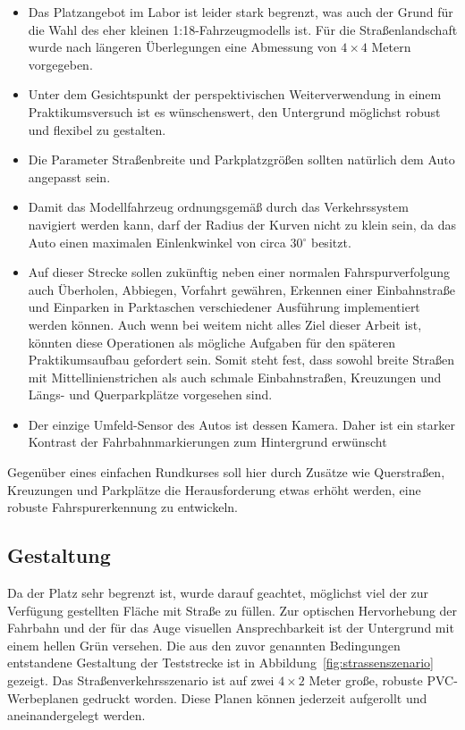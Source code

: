 \begin{itemize}
	\item Das Platzangebot im Labor ist leider stark begrenzt, was auch der Grund für die Wahl des eher kleinen 1:18-Fahrzeugmodells ist. Für die Straßenlandschaft wurde nach längeren Überlegungen eine Abmessung von \(4 \times 4\) Metern vorgegeben.
	
	\item Unter dem Gesichtspunkt der perspektivischen Weiterverwendung in einem Praktikumsversuch ist es wünschenswert, den Untergrund möglichst robust und flexibel zu gestalten.
	
	\item Die Parameter Straßenbreite und Parkplatzgrößen sollten natürlich dem Auto angepasst sein. 
	
	\item Damit das Modellfahrzeug ordnungsgemäß durch das Verkehrssystem navigiert werden kann, darf der Radius der Kurven nicht zu klein sein, da das Auto einen maximalen Einlenkwinkel von circa 30\(^\circ\) besitzt. 
	
	\item Auf dieser Strecke sollen zukünftig neben einer normalen Fahrspurverfolgung auch Überholen, Abbiegen, Vorfahrt gewähren, Erkennen einer Einbahnstraße und Einparken in Parktaschen verschiedener Ausführung implementiert werden können. Auch wenn bei weitem nicht alles Ziel dieser Arbeit ist, könnten diese Operationen als mögliche Aufgaben für den späteren Praktikumsaufbau gefordert sein. Somit steht fest, dass sowohl breite Straßen mit Mittellinienstrichen als auch schmale Einbahnstraßen, Kreuzungen und Längs- und Querparkplätze vorgesehen sind.
	
	\item Der einzige Umfeld-Sensor des Autos ist dessen Kamera. Daher ist ein starker Kontrast der Fahrbahnmarkierungen zum Hintergrund erwünscht
\end{itemize}

Gegenüber eines einfachen Rundkurses soll hier durch Zusätze wie Querstraßen, Kreuzungen und Parkplätze die Herausforderung etwas erhöht werden, eine robuste Fahrspurerkennung zu entwickeln. 

\subsection{Gestaltung}

Da der Platz sehr begrenzt ist, wurde darauf geachtet, möglichst viel der zur Verfügung gestellten Fläche mit Straße zu füllen. Zur optischen Hervorhebung der Fahrbahn und der für das Auge visuellen Ansprechbarkeit ist der Untergrund mit einem hellen Grün versehen. Die aus den zuvor genannten Bedingungen entstandene Gestaltung der Teststrecke ist in Abbildung~\ref{fig:strassenszenario} gezeigt. Das Straßenverkehrsszenario ist auf zwei \(4 \times 2\) Meter große, robuste PVC-Werbeplanen gedruckt worden. Diese Planen können jederzeit aufgerollt und aneinandergelegt werden.

